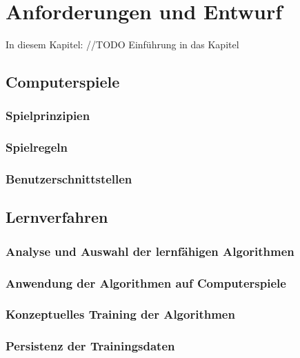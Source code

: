 \chapter{Anforderungen und Entwurf}
\label{cha:anforderungen-entwurf}

In diesem Kapitel: //TODO Einführung in das Kapitel

\section{Computerspiele}
\label{sec:computerspiele}

\subsection{Spielprinzipien}

\subsection{Spielregeln}

\subsection{Benutzerschnittstellen}





\section{Lernverfahren}
\label{sec:lernverfahren}

\subsection{Analyse und Auswahl der lernfähigen Algorithmen}

\subsection{Anwendung der Algorithmen auf Computerspiele}

\subsection{Konzeptuelles Training der Algorithmen}

\subsection{Persistenz der Trainingsdaten}